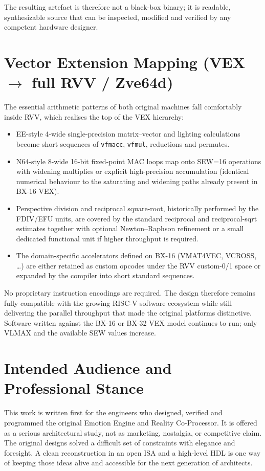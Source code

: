 \documentclass[11pt,a4paper]{article}
\begin{document}
The resulting artefact is therefore not a black-box binary; it is readable, synthesizable source that can be inspected, modified and verified by any competent hardware designer.

\section{Vector Extension Mapping (VEX $\rightarrow$ full RVV / Zve64d)}

The essential arithmetic patterns of both original machines fall comfortably inside RVV, which realises the top of the VEX hierarchy:

\begin{itemize}[leftmargin=1.5em]
  \item EE-style 4-wide single-precision matrix--vector and lighting calculations become short sequences of \texttt{vfmacc}, \texttt{vfmul}, reductions and permutes.
  \item N64-style 8-wide 16-bit fixed-point MAC loops map onto SEW=16 operations with widening multiplies or explicit high-precision accumulation (identical numerical behaviour to the saturating and widening paths already present in BX-16 VEX).
  \item Perspective division and reciprocal square-root, historically performed by the FDIV/EFU units, are covered by the standard reciprocal and reciprocal-sqrt estimates together with optional Newton--Raphson refinement or a small dedicated functional unit if higher throughput is required.
  \item The domain-specific accelerators defined on BX-16 (VMAT4VEC, VCROSS, \ldots) are either retained as custom opcodes under the RVV custom-0/1 space or expanded by the compiler into short standard sequences.
\end{itemize}

No proprietary instruction encodings are required. The design therefore remains fully compatible with the growing RISC-V software ecosystem while still delivering the parallel throughput that made the original platforms distinctive. Software written against the BX-16 or BX-32 VEX model continues to run; only VLMAX and the available SEW values increase.

\section{Intended Audience and Professional Stance}

This work is written first for the engineers who designed, verified and programmed the original Emotion Engine and Reality Co-Processor. It is offered as a serious architectural study, not as marketing, nostalgia, or competitive claim. The original designs solved a difficult set of constraints with elegance and foresight. A clean reconstruction in an open ISA and a high-level HDL is one way of keeping those ideas alive and accessible for the next generation of architects.
\end{document}

